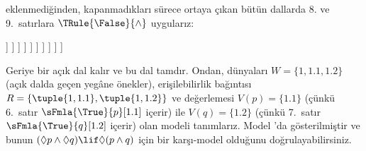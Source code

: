 \documentclass[../../../include/open-logic-section]{subfiles}
\begin{document}
{\begin{ex}
  eklenmediğinden, kapanmadıkları sürece ortaya çıkan bütün dallarda 8. ve
  9.~satırlara $\TRule{\False}{\land}$ uygularız:
  \begin{oltableau}
    [\pFmla{\False}{(\Diamond p \land \Diamond q) \lif \Diamond(p \land q)}{1},
      just = \TAss, checked
      [\pFmla{\True}{\Diamond p \land \Diamond q}{1},
        just = {\TRule{\False}{\lif}[1]}, checked
        [\pFmla{\False}{\Diamond(p \land q)}{1},
          just = {\TRule{\False}{\lif}[1]}
          [\pFmla{\True}{\Diamond p}{1},
            just = {\TRule{\True}{\land}[2]}, checked
            [\pFmla{\True}{\Diamond q}{1},
              just = {\TRule{\True}{\land}[2]}, checked
              [\pFmla{\True}{p}{1.1}, 
                just = {\TRule{\True}{\Diamond}[4]}, checked
                [\pFmla{\True}{q}{1.2}, 
                  just = {\TRule{\True}{\Diamond}[5]}, checked
                  [\pFmla{\False}{p \land q}{1.1}, 
                    just = {\TRule{\False}{\Diamond}[3]}, checked
                    [\pFmla{\False}{p \land q}{1.2}, 
                      just = {\TRule{\False}{\Diamond}[3]}, checked
                      [\pFmla{\False}{p}{1.1},
                        just = {\TRule{\False}{\land}[8]}, checked, close
                      ]
                      [\pFmla{\False}{q}{1.1},
                        just = {\TRule{\False}{\land}[8]}, checked
                        [\pFmla{\False}{p}{1.2},
                          just = {\TRule{\False}{\land}[9]}, checked]
                        [\pFmla{\False}{q}{1.2},
                          just = {\TRule{\False}{\land}[9]}, checked, close]
                      ]
                    ]
                  ]
                ]
              ]
            ]
          ]
        ]
      ]
    ]
  \end{oltableau}
  Geriye bir açık dal kalır ve bu dal tamdır. Ondan, dünyaları
  $W = \{1, 1.1, 1.2\}$ (açık dalda geçen yegâne önekler), erişilebilirlik
  bağıntısı $R = \{\tuple{1, 1.1}, \tuple{1, 1.2}\}$ ve değerlemesi
  $V(p)=\{1.1\}$ (çünkü 6.~satır $\sFmla{\True}{p}[1.1]$ içerir) ile
  $V(q)=\{1.2\}$ (çünkü 7.~satır $\sFmla{\True}{q}[1.2]$ içerir) olan modeli
  tanımlarız. Model 'da gösterilmiştir ve bunun
  $(\Diamond p \land \Diamond q) \lif \Diamond (p \land q)$ için bir
  karşı-model olduğunu doğrulayabilirsiniz.
  \begin{figure}
  \begin{center}
\end{center}
\end{figure}
\end{ex}}
\end{document}
